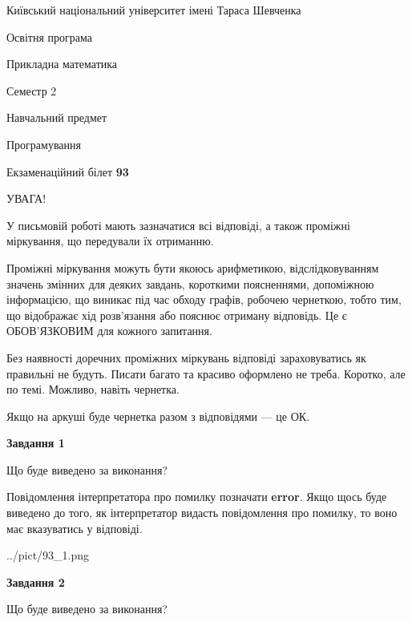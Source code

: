 \documentclass[12pt, ukrainian]{article}
\begin{document}
{{\begin {small}\par
{ \center  Київський національний університет імені Тараса Шевченка \par}
{\parbox {5 cm}{Освітня програма \hfill}{\parbox {7 cm}{Прикладна математика \hfill}}\parbox {6 cm}{\hfill Семестр 2}}\par
{\parbox {5 cm} {Навчальний предмет \hfill}\parbox {7 cm}{Програмування \hfill}\parbox {6cm}{\hfill}\par}\vspace{-7pt} \end{small}}{\center Екзаменаційний білет \No \textbf
{ 93 }\par}}
{
\begin {large}
УВАГА!

У письмовій роботі мають зазначатися всі відповіді, а також проміжні міркування, що передували їх отриманню.

Проміжні міркування можуть бути якоюсь арифметикою, відслідковуванням зна\-чень змінних для деяких завдань,
короткими поясненнями, допоміжною інформацією, що виникає під час обходу графів, робочею чернеткою,
тобто тим, що відображає хід розв’язання або пояснює отриману відповідь.
Це є ОБОВ’ЯЗКОВИМ для кожного запитання.

Без наявності доречних проміжних міркувань відповіді зараховуватись як правиль\-ні не будуть.
Писати багато та красиво оформлено не треба. Коротко, але по темі. Можли\-во, навіть чернетка.

Якщо на аркуші буде чернетка разом з відповідями --- це ОК.

\newpage

{\begin {center}\textbf{Завдання 1}\end {center}}\par
Що буде виведено за виконання?

Повідомлення інтерпретатора про помилку позначати \textbf{error}.
Якщо щось буде виведено до того, як інтерпретатор видасть повідомлення про помилку, 
то воно має вказуватись у відповіді. \par


\begin{center}
	{../pict/93_1.png}
\end{center}
\newpage

{\begin {center}\textbf{Завдання 2}\end {center}}\par
Що буде виведено за виконання?


\end{large}}
\end{document}
